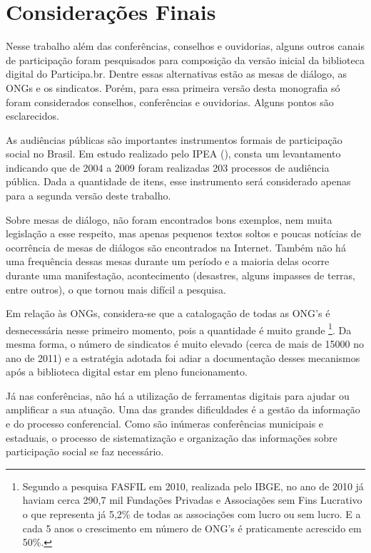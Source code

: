 \chapter{Considerações Finais}

Nesse trabalho além das conferências, conselhos e ouvidorias, alguns outros canais de participação foram pesquisados para composição da versão inicial da biblioteca digital do Participa.br. Dentre essas alternativas estão as mesas de diálogo, as ONGs e os sindicatos. Porém, para essa primeira versão desta monografia só foram considerados conselhos, conferências e ouvidorias. Alguns pontos são esclarecidos.

As audiências públicas são importantes instrumentos formais de participação social no Brasil. Em estudo realizado pelo IPEA (\citeyear{ipea2013audiencia}), consta um levantamento indicando que de 2004 a 2009 foram realizadas 203 processos de audiência pública. Dada a quantidade de itens, esse instrumento será considerado apenas para a segunda versão deste trabalho.

Sobre mesas de diálogo, não foram encontrados bons exemplos, nem muita legislação a esse respeito, mas apenas pequenos textos soltos e poucas notícias de ocorrência de mesas de diálogos são encontrados na Internet. Também não há uma frequência dessas mesas durante um período e a maioria delas ocorre durante uma manifestação, acontecimento (desastres, alguns impasses de terras, entre outros), o que tornou mais difícil a pesquisa.

Em relação às ONGs, considera-se que a catalogação de todas as ONG’s é desnecessária nesse primeiro momento, pois a quantidade é muito grande  \cite{ibge2012ongs} \footnote{Segundo a pesquisa FASFIL em 2010, realizada pelo IBGE, no ano de 2010 já haviam cerca 290,7 mil Fundações Privadas e Associações sem Fins Lucrativo o que representa já 5,2\% de todas as associações com lucro ou sem lucro. E a cada 5 anos o crescimento em número de ONG’s é praticamente acrescido em 50\%.}. Da mesma forma, o número de sindicatos é muito elevado (cerca de mais de 15000 no ano de 2011) e a estratégia adotada foi adiar a documentação desses mecanismos após a biblioteca digital estar em pleno funcionamento.

Já nas conferências, não há a utilização de ferramentas digitais para ajudar ou amplificar a sua atuação. Uma das grandes dificuldades é a gestão da informação e do processo conferencial. Como são inúmeras conferências municipais e estaduais, o processo de sistematização e organização das informações sobre participação social se faz necessário. 

